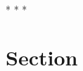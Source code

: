 \documentclass[11pt]{article}
\title{}
\author{Jonathan Yong}
\date{\today}
\begin{document}
\maketitle
\tableofcontents

\begin{center}
    \vspace{0.5cm}
    * * *
\end{center}

\section{Section}


\printbibliography[heading=bibintoc]{}
\end{document}
